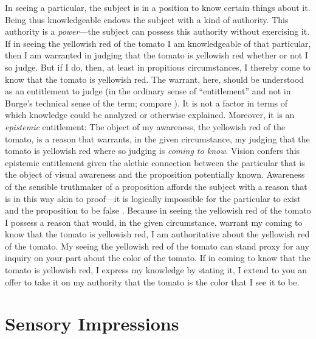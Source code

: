 \documentclass[12pt]{article}
\begin{document}
In seeing a particular, the subject is in a position to know certain things about it. Being thus knowledgeable endows the subject with a kind of authority. This authority is a \emph{power}---the subject can possess this authority without exercising it. If in seeing the yellowish red of the tomato I am knowledgeable of that particular, then I am warranted in judging that the tomato is yellowish red whether or not I so judge. But if I do, then, at least in propitious circumstances, I thereby come to know that the tomato is yellowish red. The warrant, here, should be understood as an entitlement to judge (in the ordinary sense of ``entitlement'' and not in Burge's \citeyear{Burge:2003fk} technical sense of the term; compare \citealt[132n]{McDowell:2009ys}). It is not a factor in terms of which knowledge could be analyzed or otherwise explained. Moreover, it is an \emph{epistemic} entitlement: The object of my awareness, the yellowish red of the tomato, is a reason that warrants, in the given circumstance, my judging that the tomato is yellowish red where so judging is \emph{coming to know}. Vision confers this epistemic entitlement given the alethic connection between the particular that is the object of visual awareness and the proposition potentially known. Awareness of the sensible truthmaker of a proposition affords the subject with a reason that is in this way akin to proof---it is logically impossible for the particular to exist and the proposition to be false \citep[see][]{Cook-Wilson:1926sf,Kalderon:2010fk,Travis:2005kx}. Because in seeing the yellowish red of the tomato I possess a reason that would, in the given circumstance, warrant my coming to know that the tomato is yellowish red, I am authoritative about the yellowish red of the tomato. My seeing the yellowish red of the tomato can stand proxy for any inquiry on your part about the color of the tomato. If in coming to know that the tomato is yellowish red, I express my knowledge by stating it, I extend to you an offer to take it on my authority that the tomato is the color that I see it to be. 


\section{Sensory Impressions} %
\label{sec:sensory_impressions}
\end{document}
